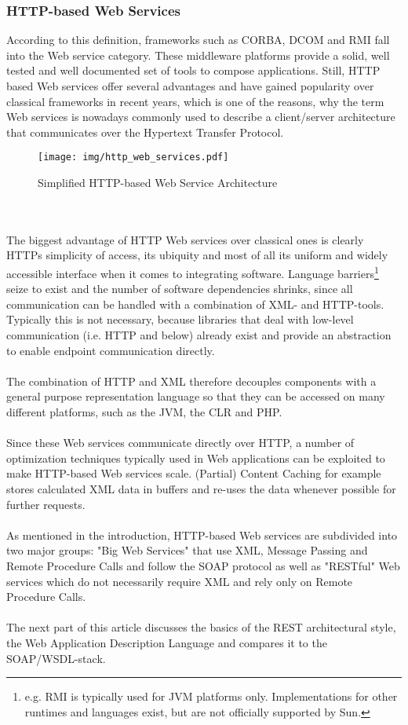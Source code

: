 \subsubsection{HTTP-based Web Services}
According to this definition, frameworks such as CORBA, DCOM and RMI fall into the Web service category. These middleware platforms provide a solid, well tested and well documented set of tools to compose applications. Still, HTTP based Web services offer several advantages and have gained popularity over classical frameworks in recent years, which is one of the reasons, why the term Web services is nowadays commonly used to describe a client/server architecture that communicates over the Hypertext Transfer Protocol.
\begin{figure}[htp]
\centering
\texttt{[image: img/http\_web\_services.pdf]}
\caption{Simplified HTTP-based Web Service Architecture}\label{fig:erptsqfit}
\end{figure}
\\ \\
The biggest advantage of HTTP Web services over classical ones is clearly HTTPs simplicity of access, its ubiquity and most of all its uniform and widely accessible interface when it comes to integrating software. Language barriers\footnote{e.g. RMI is typically used for JVM platforms only. Implementations for other runtimes and languages exist, but are not officially supported by Sun.} seize to exist and the number of software dependencies shrinks, since all communication can be handled with a combination of XML- and HTTP-tools. Typically this is not necessary, because libraries that deal with low-level communication (i.e. HTTP and below) already exist and provide an abstraction to enable endpoint communication directly.
\\ \\
The combination of HTTP and XML therefore decouples components with a general purpose representation language so that they can be accessed on many different platforms, such as the JVM, the CLR and PHP.
\\ \\
Since these Web services communicate directly over HTTP, a number of optimization techniques typically used in Web applications can be exploited to make HTTP-based Web services scale. (Partial) Content Caching for example stores calculated XML data in buffers and re-uses the data whenever possible for further requests.
\\ \\
As mentioned in the introduction, HTTP-based Web services are subdivided into two major groups: "Big Web Services" that use XML, Message Passing and Remote Procedure Calls and follow the SOAP protocol as well as "RESTful" Web services which do not necessarily require XML and rely only on Remote Procedure Calls. 
\\ \\
The next part of this article discusses the basics of the REST architectural style, the Web Application Description Language and compares it to the SOAP/WSDL-stack.